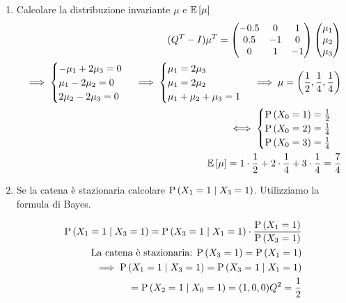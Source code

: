 \begin{exrc}
\begin{enumerate}
		\item Calcolare la distribuzione invariante $ \mu $ e $ \mathbb{E}\left[\mu\right] $ 
		\begin{equation*}
			\begin{aligned}
			(Q^T-I)\mu^T = \begin{pmatrix}
			-0.5 & 0 & 1 \\
			0.5 & -1 & 0 \\
			0 & 1 & -1
			\end{pmatrix} \begin{pmatrix}
			\mu_1 \\ \mu_2 \\ \mu_3
			\end{pmatrix} \\
			\implies \begin{cases}
			- \mu_1 + 2\mu_3 = 0 \\ 
			\mu_1 - 2\mu_2 = 0 \\
			2\mu_2 - 2\mu_3 = 0
			\end{cases} \implies \begin{cases}
			\mu_1 = 2\mu_3 \\
			\mu_1 = 2\mu_2 \\
			\mu_1 + \mu_2 + \mu_3 = 1
			\end{cases} 
			\implies \mu = \left(\dfrac{1}{2}, \dfrac{1}{4}, \dfrac{1}{4}\right) \\ 
			\iff \begin{cases}
			\text{P}\left(X_0 = 1\right) = \frac{1}{2} \\
			\text{P}\left(X_0 = 2\right) = \frac{1}{4} \\
			\text{P}\left(X_0 = 3\right) = \frac{1}{4} \\	
			\end{cases} \\
			\mathbb{E}\left[\mu\right] = 1 \cdot \dfrac{1}{2} + 2 \cdot \dfrac{1}{4} + 3 \cdot \dfrac{1}{4} = \dfrac{7}{4}
			\end{aligned} 
		\end{equation*}
		
		\item Se la catena \`e stazionaria calcolare $ \text{P}\left(X_1 = 1 \mid X_3 = 1\right) $. Utilizziamo la formula di Bayes. 
		
		\begin{equation*}
			\begin{aligned}
			\text{P}\left(X_1 = 1 \mid X_3 = 1\right) = \text{P}\left(X_3 = 1 \mid X_1 = 1\right) \cdot \dfrac{\text{P}\left(X_1 = 1\right)}{\text{P}\left(X_3 = 1\right)} \\
			\text{La catena \`e stazionaria: } \text{P}\left(X_3 = 1\right) = \text{P}\left(X_1 = 1\right) \\
			\implies \text{P}\left(X_1 = 1 \mid X_3 = 1\right) = \text{P}\left(X_3 = 1 \mid X_1 = 1\right) \\ 
			= \text{P}\left(X_2 = 1 \mid X_0 = 1\right) = (1, 0, 0) Q^2 = \dfrac{1}{2}
			\end{aligned}
		\end{equation*}
	\end{enumerate}
\end{exrc}






